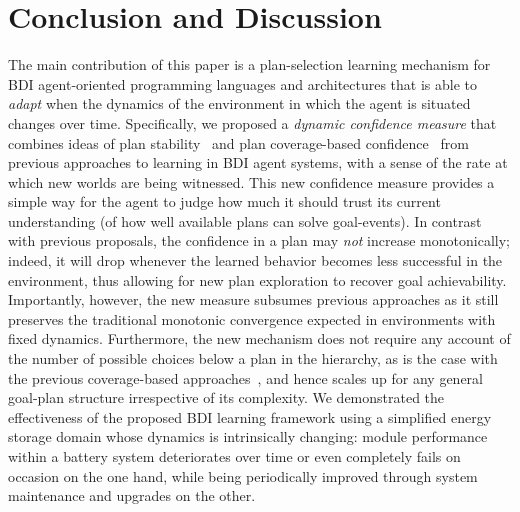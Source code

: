 \section{Conclusion and Discussion}\label{sec:discussion}

The main contribution of this paper is a plan-selection learning mechanism for BDI agent-oriented programming languages and architectures that is able to \emph{adapt} when the dynamics of the environment in which the agent is situated changes over time.
Specifically, we proposed a \emph{dynamic confidence measure} that combines ideas of plan stability~\cite{airiau09:enhancing} and plan coverage-based confidence~\cite{singh10:extending,singh10:learning} from previous approaches to learning in BDI agent systems, with a sense of the rate at which new worlds are being witnessed. This new confidence measure provides a simple way for the agent to judge how much it should trust its current understanding (of how well available plans can solve goal-events). 
In contrast with previous proposals, the confidence in a plan may \emph{not} increase monotonically; indeed, it will drop whenever the learned behavior becomes less successful in the environment, thus allowing for new plan exploration to recover goal achievability. 
%
Importantly, however, the new measure subsumes previous approaches as it still preserves the traditional monotonic convergence expected in environments with fixed dynamics.
%
Furthermore, the new mechanism does not require any account of the number of possible choices below a plan in the hierarchy, as is the case with the previous coverage-based approaches~\cite{singh10:extending,singh10:learning}, and hence scales up for any general goal-plan structure irrespective of its complexity. 
We demonstrated the effectiveness of the proposed BDI learning framework using a simplified energy storage domain whose dynamics is intrinsically changing: module performance within a battery system deteriorates over time or even completely fails on occasion on the one hand, while being periodically improved through system maintenance and upgrades on the other.  



